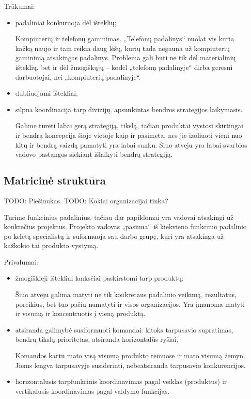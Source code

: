 Trūkumai:
\begin{itemize}
  \item padaliniai konkuruoja dėl išteklių;
    \begin{exmp}
      Kompiuterių ir telefonų gaminimas. „Telefonų padalinys“ nuolat
      vis kuria kažką naujo ir tam reikia daug lėšų, kurių tada negauna
      už kompiuterių gaminimą atsakingas padalinys. Problema gali būti
      ne tik dėl materialinių išteklių, bet ir dėl žmogiškųjų – kodėl
      „telefonų padalinyje“ dirba geresni darbuotojai, nei „kompiuterių
      padalinyje“.
    \end{exmp}
  \item dubliuojami ištekliai;
  \item silpna koordinacija tarp divizijų, apsunkintas bendros strategijos
    laikymasis.
    \begin{note}
      Galime turėti labai gerą strategiją, tikslą, tačiau produktai
      vystosi skirtingai ir bendra koncepcija šioje vietoje kaip ir
      pasimeta, nes jie izoliuoti vieni nuo kitų ir bendrą vaizdą
      pamatyti yra labai sunku. Šiuo atveju yra labai svarbios
      vadovo pastangos siekiant išlaikyti bendrą strategiją.
    \end{note}
\end{itemize}

\subsection{Matricinė struktūra}

TODO: Piešinukas.
TODO: Kokiai organizacijai tinka?

Turime funkcinius padalinius, tačiau dar papildomai yra vadovai
atsakingi už konkrečius projektus. Projekto vadovas „pasiima“ iš
kiekvieno funkcinio padalinio po keletą specialistų ir suformuoja
sau darbo grupę, kuri yra atsakinga už kažkokio tai produkto vystymą.

Privalumai:
\begin{itemize}
  \item žmogiškieji ištekliai lanksčiai paskirstomi tarp produktų;
    \begin{note}
      Šiuo atveju galima matyti ne tik konkretaus padalinio veikimą,
      rezultatus, poreikius, bet tuo pačiu numatyti ir visos
      organizacijos. Yra įmanoma matyti ir visumą ir koncentruotis į
      vieną produktą.
    \end{note}
  \item atsiranda galimybė susiformuoti komandai: kitoks tarpusavio 
    supratimas, bendrų tikslų prioritetas, atsiranda horizontalūs
    ryšiai;
    \begin{note}
      Komandos kartu mato visą visumą produkto rėmuose ir mato visumą
      žemyn. Jiems lengva tarpusavyje susiderinti, nebeatsiranda
      tarpusavio konkurencijos.
    \end{note}
  \item horizontalusis tarpfunkcinis koordinavimas pagal veiklas 
    (produktus) ir vertikalusis koordinavimas pagal valdymo funkcijas.
\end{itemize}

